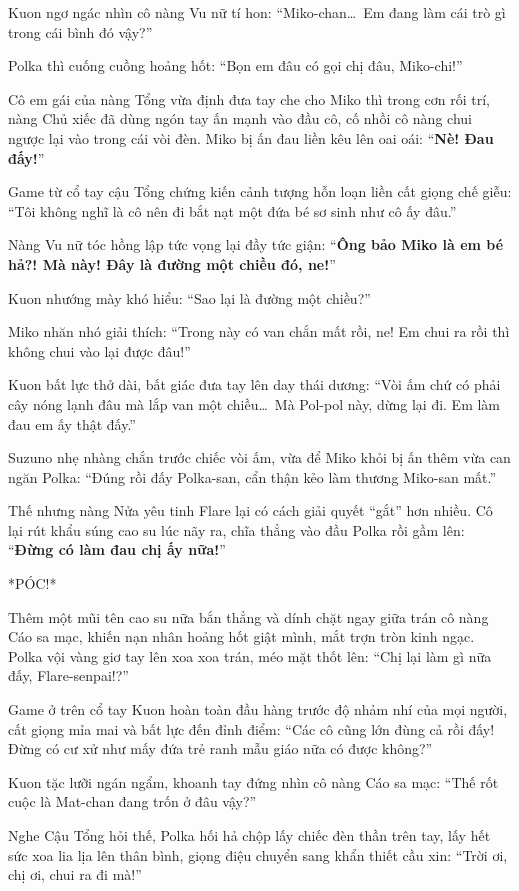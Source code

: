 \documentclass[../main.tex]{subfiles}
\begin{document}
Kuon ngơ ngác nhìn cô nàng Vu nữ tí hon: ``Miko-chan\dots\ Em đang làm cái trò gì trong cái bình đó vậy?''

Polka thì cuống cuồng hoảng hốt: ``Bọn em đâu có gọi chị đâu, Miko-chi!''

Cô em gái của nàng Tổng vừa định đưa tay che cho Miko thì trong cơn rối trí, nàng Chủ xiếc đã dùng ngón tay ấn mạnh vào đầu cô, cố nhồi cô nàng chui ngược lại vào trong cái vòi đèn. Miko bị ấn đau liền kêu lên oai oái: ``\textbf{Nè! Đau đấy!}''

Game từ cổ tay cậu Tổng chứng kiến cảnh tượng hỗn loạn liền cất giọng chế giễu: ``Tôi không nghĩ là cô nên đi bắt nạt một đứa bé sơ sinh như cô ấy đâu.''

Nàng Vu nữ tóc hồng lập tức vọng lại đầy tức giận: ``\textbf{Ông bảo Miko là em bé hả?! Mà này! Đây là đường một chiều đó, ne!}''

Kuon nhướng mày khó hiểu: ``Sao lại là đường một chiều?''

Miko nhăn nhó giải thích: ``Trong này có van chắn mất rồi, ne! Em chui ra rồi thì không chui vào lại được đâu!''

Kuon bất lực thở dài, bất giác đưa tay lên day thái dương: ``Vòi ấm chứ có phải cây nóng lạnh đâu mà lắp van một chiều\dots\ Mà Pol-pol này, dừng lại đi. Em làm đau em ấy thật đấy.''

Suzuno nhẹ nhàng chắn trước chiếc vòi ấm, vừa để Miko khỏi bị ấn thêm vừa can ngăn Polka: ``Đúng rồi đấy Polka-san, cẩn thận kẻo làm thương Miko-san mất.''

Thế nhưng nàng Nửa yêu tinh Flare lại có cách giải quyết ``gắt'' hơn nhiều. Cô lại rút khẩu súng cao su lúc nãy ra, chĩa thẳng vào đầu Polka rồi gầm lên: ``\textbf{Đừng có làm đau chị ấy nữa!}''

*PÓC!*

Thêm một mũi tên cao su nữa bắn thẳng và dính chặt ngay giữa trán cô nàng Cáo sa mạc, khiến nạn nhân hoảng hốt giật mình, mắt trợn tròn kinh ngạc. Polka vội vàng giơ tay lên xoa xoa trán, méo mặt thốt lên: ``Chị lại làm gì nữa đấy, Flare-senpai!?''

Game ở trên cổ tay Kuon hoàn toàn đầu hàng trước độ nhảm nhí của mọi người, cất giọng mỉa mai và bất lực đến đỉnh điểm: ``Các cô cũng lớn đùng cả rồi đấy! Đừng có cư xử như mấy đứa trẻ ranh mẫu giáo nữa có được không?''

Kuon tặc lưỡi ngán ngẩm, khoanh tay đứng nhìn cô nàng Cáo sa mạc: ``Thế rốt cuộc là Mat-chan đang trốn ở đâu vậy?''

Nghe Cậu Tổng hỏi thế, Polka hối hả chộp lấy chiếc đèn thần trên tay, lấy hết sức xoa lia lịa lên thân bình, giọng điệu chuyển sang khẩn thiết cầu xin: ``Trời ơi, chị ơi, chui ra đi mà!''
\end{document}
